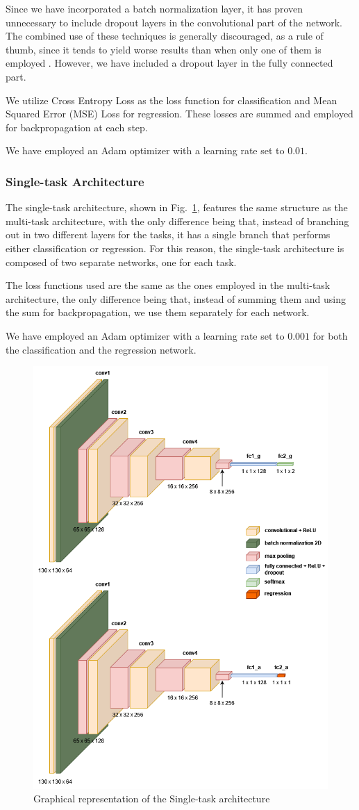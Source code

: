 Since we have incorporated a batch normalization layer,
it has proven unnecessary to include dropout layers in the convolutional part
of the network.
The combined use of these techniques is generally discouraged,
as a rule of thumb, since it tends to yield worse results than
when only one of them is employed \cite{app3}.
However, we have included a dropout layer in the fully connected part.

We utilize Cross Entropy Loss as the loss function for classification
and Mean Squared Error (MSE) Loss for regression.
These losses are summed and employed for backpropagation at each step.

We have employed an Adam optimizer with a learning rate set to $0.01$.

\subsubsection{Single-task Architecture} \label{sec:single}

The single-task architecture, shown in Fig.~\ref{cnn2},
features the same structure as the multi-task architecture,
with the only difference being that, instead of branching out
in two different layers for the tasks, it has a single branch
that performs either classification or regression.
For this reason, the single-task architecture is composed of
two separate networks, one for each task.

The loss functions used are the same as the ones employed
in the multi-task architecture, the only difference being
that, instead of summing them and using the sum for backpropagation,
we use them separately for each network.

We have employed an Adam optimizer with a learning rate set to $0.001$
for both the classification and the regression network.\\

\begin{figure}[htbp]
    \centerline{\includegraphics[width=.5\textwidth]{images/single_cnn.png}}
    \caption{Graphical representation of the Single-task architecture}
    \label{cnn2}
\end{figure}

